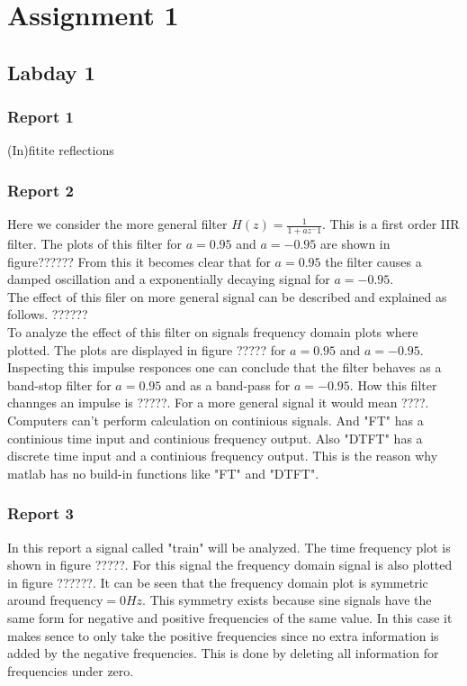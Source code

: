 \documentclass[11pt,titlepage]{report}
\begin{document}
\chapter{Assignment 1}
\section{Labday 1}
\subsection{Report 1}
(In)fitite reflections

\subsection{Report 2}
Here we consider the more general filter $H(z) = \frac{1}{1+az^-1}$.  This is a first order IIR filter. The plots of this filter for $a=0.95$ and $a=-0.95$ are shown in figure?????? From this it becomes clear that for $a=0.95$ the filter causes a damped oscillation and a exponentially decaying signal for $a=-0.95$. \\

The effect of this filer on more general signal can be described and explained as follows. ?????? \\

To analyze the effect of this filter on signals frequency domain plots where plotted. The plots are displayed in figure ????? for $a=0.95$ and $a=-0.95$. Inspecting this impulse responces one can conclude that the filter behaves as a band-stop filter for $a=0.95$ and as a band-pass for $a=-0.95$. How this filter channges an impulse is ?????. For a more general signal it would mean ????. \\

Computers can't perform calculation on continious signals. And "FT" has a continious time input and continious frequency output. Also "DTFT" has a discrete time input and a continious frequency output. This is the reason why matlab has no build-in functions like "FT" and "DTFT". 

\subsection{Report 3}
In this report a signal called "train" will be analyzed. The time frequency plot is shown in figure ?????. For this signal the frequency domain signal is also plotted in figure ??????.
It can be seen that the frequency domain plot is symmetric around frequency$= 0Hz$. This symmetry exists because sine signals have the same form for negative and positive frequencies of the same value. In this case it makes sence to only take the positive frequencies since no extra information is added by the negative frequencies. This is done by deleting all information for frequencies under zero. 
\end{document}
